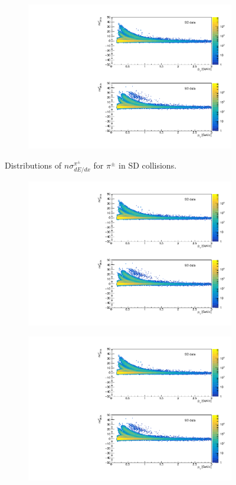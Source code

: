 \begin{figure}[H]
{\begin{subfigure}[b]{\linewidth}{
					{\includegraphics[width=\linewidth, page=13]{graphics/pid/spectraFit_SDT.pdf}}}
			\end{subfigure}
		}
	\caption[Distributions of $n\sigma^{\pi^\pm}_{dE/dx}$ for $\pi^\pm$ in SD collisions]{Distributions of $n\sigma^{\pi^\pm}_{dE/dx}$ for $\pi^\pm$ in SD collisions.}
	\label{fig:nsigmapifit}
\end{figure}
\begin{figure}[H]
	\centering
	\parbox{0.3\textwidth}{
		\centering
		\begin{subfigure}[b]{\linewidth}{
				{\includegraphics[width=\linewidth, page=15]{graphics/pid/spectraFit_SDT.pdf}}}
		\end{subfigure}
	}
	\quad
	\parbox{0.3\textwidth}{
		\centering
		\begin{subfigure}[b]{\linewidth}{
				{\includegraphics[width=\linewidth, page=16]{graphics/pid/spectraFit_SDT.pdf}}}

\end{subfigure}}
\end{figure}
